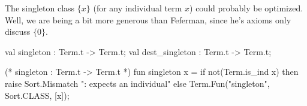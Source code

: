 \begin{node}
The singleton class $\{x\}$ (for any individual term $x$) could
probably be optimized. Well, we are being a bit more generous than
Feferman, since he's axioms only discuss $\{0\}$.
\end{node}

\nwenddocs{}\endmoddef\nwstartdeflinemarkup{}\nwenddeflinemarkup
val singleton : Term.t -> Term.t;
val dest_singleton : Term.t -> Term.t;
\nwendcode{}\nwdocspar

\nwenddocs{}\endmoddef\nwstartdeflinemarkup{}\nwenddeflinemarkup
(* singleton : Term.t -> Term.t *)
fun singleton x =
  if not(Term.is_ind x)
  then raise Sort.Mismatch ": expects an individual"
  else Term.Fun("singleton", Sort.CLASS, [x]);

